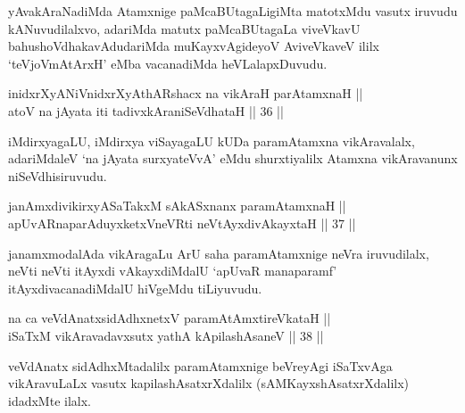 \begin{artha}
yAvakAraNadiMda Atamxnige paMcaBUtagaLigiMta matotxMdu vasutx iruvudu
kANuvudilalxvo, adariMda matutx paMcaBUtagaLa viveVkavU
bahushoVdhakavAdudariMda muKayxvAgideyoV AviveVkaveV ililx
`teVjoVmAtArxH' eMba vacanadiMda heVLalapxDuvudu.
\end{artha}


\begin{shl}
inidxrXyANiVnidxrXyAthARshacx na vikAraH parAtamxnaH || \\
atoV na jAyata iti tadivxkAraniSeVdhataH \hfill || 36 ||  
\end{shl}

\begin{artha}
iMdirxyagaLU, iMdirxya viSayagaLU kUDa paramAtamxna vikAravalalx,
adariMdaleV `na jAyata surxyateVvA' eMdu shurxtiyalilx Atamxna
vikAravanunx niSeVdhisiruvudu.
\end{artha}

\begin{shl}
janAmxdivikirxyASaTakxM sAkASxnanx paramAtamxnaH || \\
apUvARnaparAduyxketxVneVRti neVtAyxdivAkayxtaH \hfill || 37 ||  
\end{shl}

\begin{artha}
janamxmodalAda vikAragaLu ArU saha paramAtamxnige neVra iruvudilalx,
neVti neVti itAyxdi vAkayxdiMdalU `apUvaR manaparamf'
itAyxdivacanadiMdalU hiVgeMdu tiLiyuvudu.
\end{artha}


\begin{shl}
na ca veVdAnatxsidAdhxnetxV paramAtAmxtireVkataH || \\
iSaTxM vikAravadavxsutx yathA kApilashAsaneV \hfill || 38 || 
\end{shl}

\begin{artha}
veVdAnatx sidAdhxMtadalilx paramAtamxnige beVreyAgi iSaTxvAga
vikAravuLaLx vasutx kapilashAsatxrXdalilx (sAMKayxshAsatxrXdalilx) idadxMte ilalx.
\end{artha}


